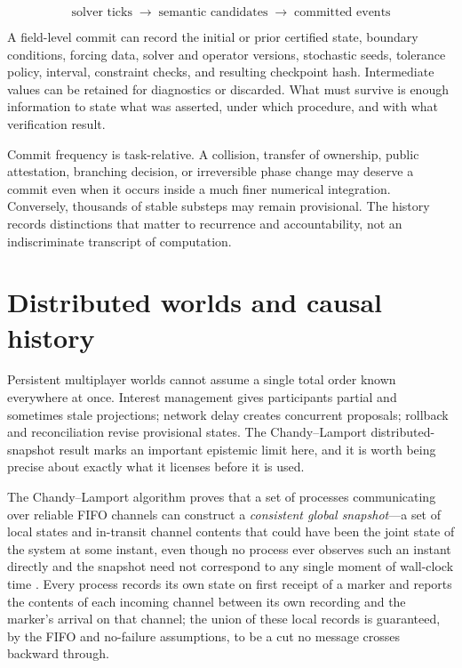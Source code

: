 \documentclass[11pt]{article}
\begin{document}
\[
\text{solver ticks} \;\to\; \text{semantic candidates} \;\to\; \text{committed events}
\]

A field-level commit can record the initial or prior certified state, boundary conditions, forcing data, solver and operator versions, stochastic seeds, tolerance policy, interval, constraint checks, and resulting checkpoint hash. Intermediate values can be retained for diagnostics or discarded. What must survive is enough information to state what was asserted, under which procedure, and with what verification result.

Commit frequency is task-relative. A collision, transfer of ownership, public attestation, branching decision, or irreversible phase change may deserve a commit even when it occurs inside a much finer numerical integration. Conversely, thousands of stable substeps may remain provisional. The history records distinctions that matter to recurrence and accountability, not an indiscriminate transcript of computation.

\section{Distributed worlds and causal history}
\label{sec:distributed}

Persistent multiplayer worlds cannot assume a single total order known everywhere at once. Interest management gives participants partial and sometimes stale projections; network delay creates concurrent proposals; rollback and reconciliation revise provisional states. The Chandy--Lamport distributed-snapshot result marks an important epistemic limit here, and it is worth being precise about exactly what it licenses before it is used.

The Chandy--Lamport algorithm proves that a set of processes communicating over reliable FIFO channels can construct a \emph{consistent global snapshot}---a set of local states and in-transit channel contents that could have been the joint state of the system at some instant, even though no process ever observes such an instant directly and the snapshot need not correspond to any single moment of wall-clock time \cite{chandylamport1985}. Every process records its own state on first receipt of a marker and reports the contents of each incoming channel between its own recording and the marker's arrival on that channel; the union of these local records is guaranteed, by the FIFO and no-failure assumptions, to be a cut no message crosses backward through.
\end{document}
